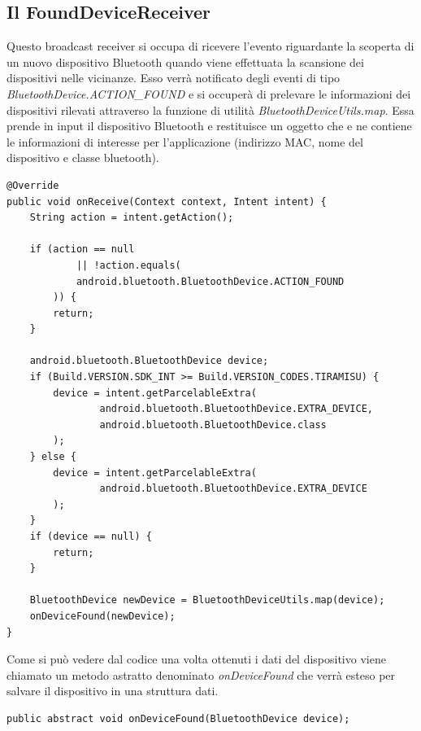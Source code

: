 \subsection{Il FoundDeviceReceiver}
Questo broadcast receiver si occupa di ricevere l'evento riguardante la scoperta di un nuovo dispositivo Bluetooth quando viene effettuata la scansione dei dispositivi nelle vicinanze. Esso verrà notificato degli eventi di tipo \textit{BluetoothDevice.ACTION\_FOUND} e si occuperà di prelevare le informazioni dei dispositivi rilevati attraverso la funzione di utilità \textit{BluetoothDeviceUtils.map}. Essa prende in input il dispositivo Bluetooth e restituisce un oggetto che e ne contiene le informazioni di interesse per l'applicazione (indirizzo MAC, nome del dispositivo e classe bluetooth).
\begin{verbatim}
@Override
public void onReceive(Context context, Intent intent) {
    String action = intent.getAction();

    if (action == null 
            || !action.equals(
            android.bluetooth.BluetoothDevice.ACTION_FOUND
        )) {
        return;
    }
    
    android.bluetooth.BluetoothDevice device;
    if (Build.VERSION.SDK_INT >= Build.VERSION_CODES.TIRAMISU) {
        device = intent.getParcelableExtra(
                android.bluetooth.BluetoothDevice.EXTRA_DEVICE,
                android.bluetooth.BluetoothDevice.class
        );
    } else {
        device = intent.getParcelableExtra(
                android.bluetooth.BluetoothDevice.EXTRA_DEVICE
        );
    }
    if (device == null) {
        return;
    }
    
    BluetoothDevice newDevice = BluetoothDeviceUtils.map(device);
    onDeviceFound(newDevice);
}
\end{verbatim}

Come si può vedere dal codice una volta ottenuti i dati del dispositivo viene chiamato un metodo astratto denominato \textit{onDeviceFound} che verrà esteso per salvare il dispositivo in una struttura dati.
\begin{verbatim}
public abstract void onDeviceFound(BluetoothDevice device);
\end{verbatim}


